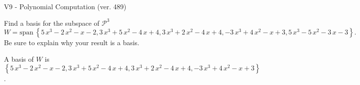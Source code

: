 \begin{exercise}
  \begin{exerciseTitle}V9 - Polynomial Computation (ver. 489)\end{exerciseTitle}
  \begin{exerciseStatement}
    Find a basis for the subspace of \(\mathcal{P}^3\) 
\[W=\mathrm{span}\ \left\{5 \, x^{3} - 2 \, x^{2} - x - 2 , 3 \, x^{3} + 5 \, x^{2} - 4 \, x + 4 , 3 \, x^{3} + 2 \, x^{2} - 4 \, x + 4 , -3 \, x^{3} + 4 \, x^{2} - x + 3 , 5 \, x^{3} - 5 \, x^{2} - 3 \, x - 3\right\}.\]
 Be sure to explain why your result is a basis.


  \end{exerciseStatement}
  \begin{exerciseAnswer}
   A basis of \(W\) is  \(\left\{5 \, x^{3} - 2 \, x^{2} - x - 2 , 3 \, x^{3} + 5 \, x^{2} - 4 \, x + 4 , 3 \, x^{3} + 2 \, x^{2} - 4 \, x + 4 , -3 \, x^{3} + 4 \, x^{2} - x + 3\right\}\).
  


  \end{exerciseAnswer}
\end{exercise}